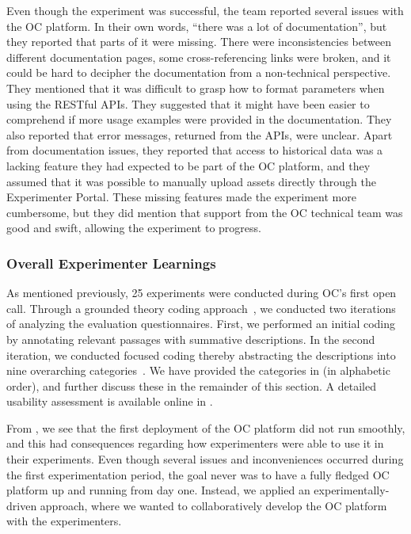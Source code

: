 Even though the experiment was successful, the team reported several issues with the OC platform. In their own words, ``there was a lot of documentation'', but they reported that parts of it were missing. There were inconsistencies between different documentation pages, some cross-referencing links were broken, and it could be hard to decipher the documentation from a non-technical perspective. They mentioned that it was difficult to grasp how to format parameters when using the RESTful APIs. They suggested that it might have been easier to comprehend if more usage examples were provided in the documentation. They also reported that error messages, returned from the APIs, were unclear. Apart from documentation issues, they reported that access to historical data was a lacking feature they had expected to be part of the OC platform, and they assumed that it was possible to manually upload assets directly through the Experimenter Portal. These missing features made the experiment more cumbersome, but they did mention that support from the OC technical team was good and swift, allowing the experiment to progress. 

\subsubsection{Overall Experimenter Learnings}

As mentioned previously, 25 experiments were conducted during OC's first open call. Through a grounded theory coding approach~\cite{charmaz2006constructing}, we conducted two iterations of analyzing the evaluation questionnaires. First, we performed an initial coding by annotating relevant passages with summative descriptions. In the second iteration, we conducted focused coding thereby abstracting the descriptions into nine overarching categories~\cite{charmaz2006constructing}. We have provided the categories in  (in alphabetic order), and further discuss these in the remainder of this section. A detailed usability assessment is available online in \cite{d55}.

From , we see that the first deployment of the OC platform did not run smoothly, and this had consequences regarding how experimenters were able to use it in their experiments. Even though several issues and inconveniences occurred during the first experimentation period, the goal never was to have a fully fledged OC platform up and running from day one. Instead, we applied an experimentally-driven approach, where we wanted to collaboratively develop the OC platform with the experimenters. 

